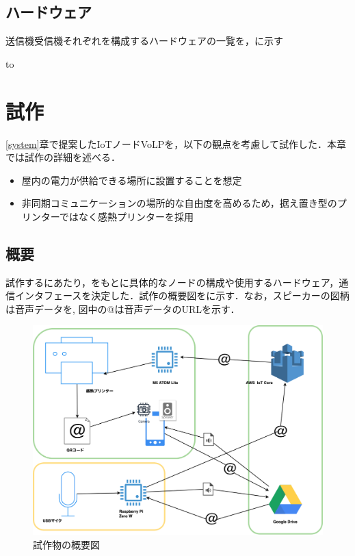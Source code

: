 \documentclass[submit,techrep,noauthor]{ipsj}
\begin{document}
\subsection{ハードウェア}
送信機受信機それぞれを構成するハードウェアの一覧を，に示す

\begin{table}[tb] 
\caption{ハードウェア一覧} 
\label{tab:sys-hardwares}
\hbox to
\end{table}

\section{試作}
\ref{system}章で提案したIoTノードVoLPを，以下の観点を考慮して試作した．本章では試作の詳細を述べる．
\begin{itemize}
    \item 屋内の電力が供給できる場所に設置することを想定
    \item 非同期コミュニケーションの場所的な自由度を高めるため，据え置き型のプリンターではなく感熱プリンターを採用
\end{itemize}
\subsection{概要}
試作するにあたり，をもとに具体的なノードの構成や使用するハードウェア，通信インタフェースを決定した．試作の概要図をに示す．なお，スピーカーの図柄は音声データを,
図中の@は音声データのURLを示す．
\begin{figure}[tb]
\includegraphics[scale=0.2,bb= 0 0 2000 1000]{image/proto_drawio.png}
\caption{試作物の概要図}
\label{fig:proto-overview}
\end{figure}
\end{document}
